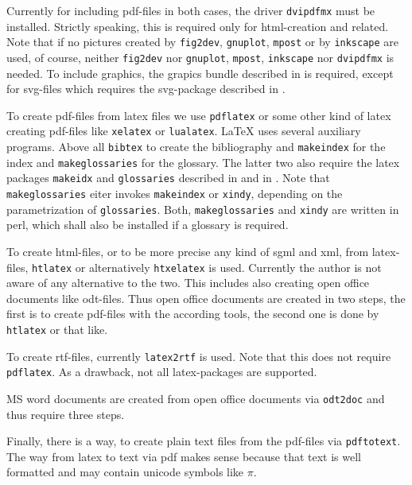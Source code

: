 \documentclass[12pt]{article}
\begin{document}
Currently for including pdf-files in both cases, 
the driver {\tt dvipdfmx} must be installed. 
Strictly speaking, this is required only for html-creation and related. 
Note that if no pictures created by {\tt fig2dev}, {\tt gnuplot}, 
{\tt mpost} or by {\tt inkscape} are used, of course, 
neither {\tt fig2dev} nor {\tt gnuplot}, {\tt mpost}, {\tt inkscape} 
nor {\tt dvipdfmx} is needed. 
To include graphics, the grapics bundle described in \cite{GraX} is required, 
except for svg-files which requires the svg-package 
described in \cite{SvgP}. 

To create pdf-files from latex files we use {\tt pdflatex} 
or some other kind of latex creating pdf-files 
like {\tt xelatex} or {\tt lualatex}. 
LaTeX uses several auxiliary programs. 
Above all {\tt bibtex} to create the bibliography 
and {\tt makeindex} for the index and {\tt makeglossaries} for the glossary. 
The latter two 
also require the latex packages {\tt makeidx} and {\tt glossaries} 
described in \cite{MkidxShIdxP} and in \cite{GloP}. 
Note that {\tt makeglossaries} eiter invokes {\tt makeindex} 
or {\tt xindy}, depending on the parametrization of {\tt glossaries}. 
Both, {\tt makeglossaries} and {\tt xindy} are written in perl, 
which shall also be installed if a glossary is required. 

To create \gls{html}-files, 
or to be more precise any kind of \gls{sgml} and \gls{xml}, 
from latex-files, {\tt htlatex} or alternatively {\tt htxelatex} is used. 
Currently the author is not aware of any alternative to the two. 
This includes also creating open office documents like odt-files. 
Thus open office documents are created in two steps, 
the first is to create pdf-files with the according tools, 
the second one is done by {\tt htlatex} or that like. 

To create rtf-files, currently {\tt latex2rtf} is used. 
Note that this does not require {\tt pdflatex}. 
As a drawback, not all latex-packages are supported. 

MS word documents are created from open office documents via {\tt odt2doc} 
and thus require three steps. 

Finally, there is a way, to create plain text files from the pdf-files 
via {\tt pdftotext}. 
The way from latex to text via pdf makes sense 
because that text is well formatted 
and may contain unicode symbols like $\pi$. 
\end{document}
